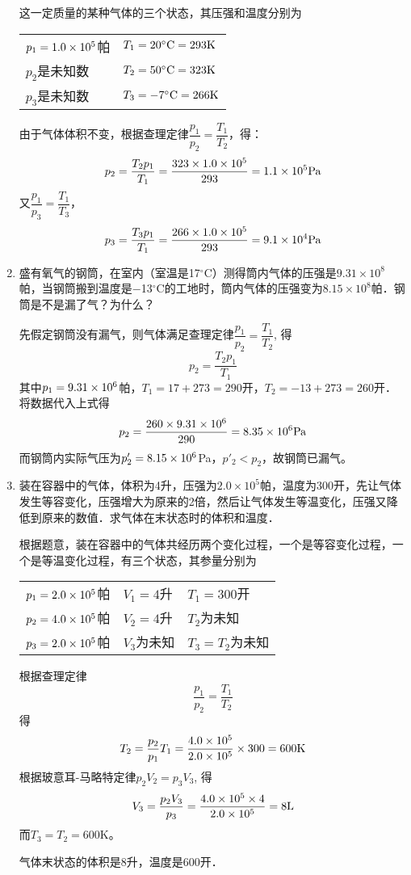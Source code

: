 \begin{enumerate}
\begin{solution}
 这一定质量的某种气体的三个状态，其压强和温度分别为
\begin{center}
\begin{tabular}{p{}p{}}
    $p_1=1.0\times10^5$帕 & $T_1=20^{\circ}{\rm C}=293{\rm K}$\\
    $p_2$是未知数& $T_2=50^{\circ}{\rm C}=323{\rm K}$\\
    $p_3$是未知数& $T_3=-7^{\circ}{\rm C}=266{\rm K}$\\
\end{tabular}
\end{center}
由于气体体积不变，根据查理定律$\dfrac{p_1}{p_2}=\dfrac{T_1}{T_2}$，得：
\[p_2=\frac{T_2p_1}{T_1}=\frac{323\times 1.0\times 10^5}{293}=1.1\times 10^5{\rm Pa}\]
又$\dfrac{p_1}{p_3}=\dfrac{T_1}{T_3}$，
\[p_3=\frac{T_3p_1}{T_1}=\frac{266\times 1.0\times 10^5}{293}=9.1\times 10^4{\rm Pa}\]
\end{solution}
\item 盛有氧气的钢筒，在室内（室温是17$^\circ$C）测得筒内气体的压强是$9.31\times 10^8$帕，当钢筒搬到温度是$-$13$^\circ$C的工地时，筒内气体的压强变为$8.15\times 10^8$帕．钢筒是不是漏了气？为什么？

\begin{solution}
先假定钢筒没有漏气，则气体满足查理定律$\dfrac{p_1}{p_2}=\dfrac{T_1}{T_2}$, 得
\[p_2=\frac{T_2p_1}{T_1}\]
其中$p_1=9.31\times10^6$帕，$T_1=17+273=290$开，$T_2=-13+273=260$开．
将数据代入上式得
\[p_2=\frac{260\times 9.31\times 10^6}{290}=8.35\times 10^6{\rm Pa}\]
而钢筒内实际气压为$p'_2=8.15\times 10^6$Pa，$p'_2<p_2$，故钢筒已漏气。
\end{solution}
\item 装在容器中的气体，体积为4升，压强为$2.0\times 10^5$帕，温度为300开，先让气体发生等容变化，压强增大为原来的2倍，然后让气体发生等温变化，压强又降低到原来的数值．求气体在末状态时的体积和温度．


\begin{solution}
根据题意，装在容器中的气体共经历两个变化过程，一个是等容变化过程，一个是等温变化过程，有三个状态，其参量分别为
\begin{center}
\begin{tabular}{p{}p{}p{}}
$p_1=2.0\times10^5$帕&$V_1=4$升& $T_1=300$开\\
$p_2=4.0\times10^5$帕& $V_2=4$升&$T_2$为未知\\
$p_3=2.0\times10^5$帕& $V_3$为未知& $T_3=T_2$为未知  \\
\end{tabular}
\end{center}

根据查理定律
\[\frac{p_1}{p_2}=\frac{T_1}{T_2}\]
得
\[T_2=\frac{p_2}{p_1}T_1=\frac{4.0\times10^5}{2.0\times10^5}\times 300=600{\rm K}\]
根据玻意耳-马略特定律$p_2V_2=p_3V_3$, 得
\[V_3=\frac{p_2V_3}{p_3}=\frac{4.0\times10^5\times 4}{2.0\times10^5}=8{\rm L}\]
而$T_3=T_2=600$K。

气体末状态的体积是8升，温度是600开．
\end{solution}
\end{enumerate}

